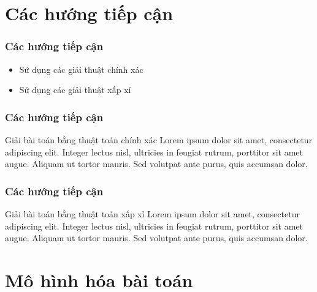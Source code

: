\documentclass{beamer}
\begin{document}
	
	\section{Các hướng tiếp cận}
	
	
	\begin{frame}
		\frametitle{Các hướng tiếp cận}
		\begin{itemize}
			\item Sử dụng các giải thuật chính xác
			\item Sử dụng các giải thuật xấp xỉ
		\end{itemize}
	\end{frame}
	
	
	\begin{frame}
		\frametitle{Các hướng tiếp cận}
		\begin{block}{Giải bài toán bằng thuật toán chính xác}
			Lorem ipsum dolor sit amet, consectetur adipiscing elit. Integer lectus nisl, ultricies in feugiat rutrum, porttitor sit amet augue. Aliquam ut tortor mauris. Sed volutpat ante purus, quis accumsan dolor.
		\end{block}
	\end{frame}

	
	\begin{frame}
		\frametitle{Các hướng tiếp cận}
		\begin{block}{Giải bài toán bằng thuật toán xấp xỉ}
			Lorem ipsum dolor sit amet, consectetur adipiscing elit. Integer lectus nisl, ultricies in feugiat rutrum, porttitor sit amet augue. Aliquam ut tortor mauris. Sed volutpat ante purus, quis accumsan dolor.
		\end{block}
	\end{frame}
	
	
	\section{Mô hình hóa bài toán}
	
	
\end{document}
